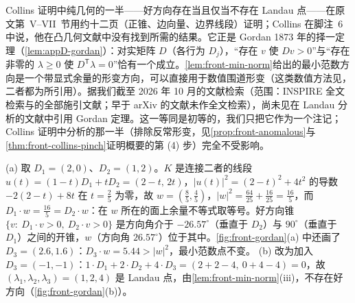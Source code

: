 \begin{remark}\label{rem:front-gordan-collins}
Collins 证明中纯几何的一半——好方向存在当且仅当不存在 Landau 点\cite[定理~3]{Collins:2020euz}——在原文第~V--VII~节用约十二页（正锥、边向量、边界线段）证明；Collins 在脚注~6 中说，他在凸几何文献中没有找到所需的结果。它正是 Gordan 1873 年的择一定理\cite{Gordan1873}（\cref{lem:appD-gordan}）：对实矩阵 $D$（各行为 $D_j$），“存在 $v$ 使 $Dv>0$”与“存在非零的 $\lambda\ge0$ 使 $D^{\mathsf T}\lambda=0$”恰有一个成立。\cref{lem:front-min-norm}给出的最小范数方向是一个带显式余量的形变方向，可以直接用于数值围道形变（这类数值方法见\cite{Gong:2008ww,Becker:2012nk}，二者都为\cite{Collins:2020euz}所引用）。据我们截至 2026 年 10 月的文献检索（范围：INSPIRE 全文检索与\cite{Collins:2020euz}的全部施引文献；早于 arXiv 的文献未作全文检索），尚未见在 Landau 分析的文献中引用 Gordan 定理。这一等同是初等的，我们只把它作为一个注记；Collins 证明中分析的那一半（排除反常形变，见\cref{prop:front-anomalous}与\cref{thm:front-collins-pinch}证明概要的第 (4) 步）完全不受影响。
\end{remark}

\begin{example}[二维中的两种情形]\label{ex:front-gordan-2d}
(a) 取 $D_1=(2,0)$、$D_2=(1,2)$。$K$ 是连接二者的线段 $u(t)=(1-t)D_1+tD_2=(2-t,\,2t)$，$|u(t)|^2=(2-t)^2+4t^2$ 的导数 $-2(2-t)+8t$ 在 $t=\frac25$ 为零，故 $w=(\frac85,\frac45)$，$|w|^2=\frac{64}{25}+\frac{16}{25}=\frac{16}5$，而 $D_1\cdot w=\frac{16}5=D_2\cdot w$：在 $w$ 所在的面上余量不等式取等号。好方向锥 $\{v:\ D_1\cdot v>0,\ D_2\cdot v>0\}$ 是方向角介于 $-26.57^\circ$（垂直于 $D_2$）与 $90^\circ$（垂直于 $D_1$）之间的开锥，$w$（方向角 $26.57^\circ$）位于其中。\cref{fig:front-gordan}(a) 中还画了 $D_3=(2.6,1.6)$：$D_3\cdot w=5.44>|w|^2$，最小范数点不变。
(b) 改为加入 $D_3=(-1,-1)$：$1\cdot D_1+2\cdot D_2+4\cdot D_3=(2+2-4,\ 0+4-4)=0$，故 $(\lambda_1,\lambda_2,\lambda_3)=(1,2,4)$ 是 Landau 点，由\cref{lem:front-min-norm}(iii)，不存在好方向（\cref{fig:front-gordan}(b)）。
\end{example}

